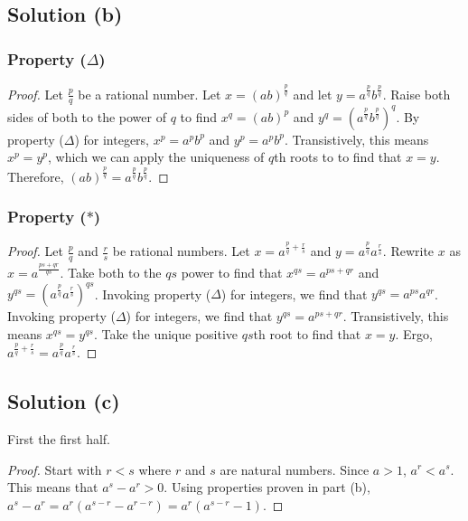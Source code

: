 \documentclass[11pt]{article}
\begin{document}
    \subsection{Solution (b)}
        \subsubsection{Property ($\Delta$)}
            \begin{proof}
                Let $\frac{p}{q}$ be a rational number.
                Let $x = (ab)^\frac{p}{q}$ and let $y = a^\frac{p}{q} b^\frac{p}{q}$.
                Raise both sides of both to the power of $q$ to find $x^q = (ab)^p$ and $y^q = \left( a^\frac{p}{q} b^\frac{p}{q} \right)^q$.
                By property ($\Delta$) for integers, $x^p = a^p b^p$ and $y^p = a^p b^p$.
                Transistively, this means $x^p = y^p$, which we can apply the uniqueness of $q$th roots to to find that $x = y$.
                Therefore, $(ab)^\frac{p}{q} = a^\frac{p}{q} b^\frac{p}{q}$.
            \end{proof}

        \subsubsection{Property ($\ast$)}
            \begin{proof}
                Let $\frac{p}{q}$ and $\frac{r}{s}$ be rational numbers.
                Let $x = a^{\frac{p}{q} + \frac{r}{s}}$ and $y = a^\frac{p}{q} a^\frac{r}{s}$.
                Rewrite $x$ as $x = a^\frac{ps + qr}{qs}$.
                Take both to the $qs$ power to find that $x^{qs} = a^{ps + qr}$ and $y^{qs} = \left( a^\frac{p}{q} a^\frac{r}{s} \right)^{qs}$.
                Invoking property ($\Delta$) for integers, we find that $y^{qs} = a^{ps} a^{qr}$.
                Invoking property ($\Delta$) for integers, we find that $y^{qs} = a^{ps + qr}$.
                Transistively, this means $x^{qs} = y^{qs}$.
                Take the unique positive $qs$th root to find that $x = y$.
                Ergo, $a^{\frac{p}{q} + \frac{r}{s}} = a^\frac{p}{q} a^\frac{r}{s}$.
            \end{proof}
    \pagebreak
    \subsection{Solution (c)}
        First the first half.
        \begin{proof}
            Start with $r < s$ where $r$ and $s$ are natural numbers.
            Since $a > 1$, $a^r < a^s$.
            This means that $a^s - a^r > 0$. 
            Using properties proven in part (b), $a^s - a^r = a^r(a^{s - r} - a^{r - r}) = a^r(a^{s - r} - 1)$.
        \end{proof}
\end{document}
